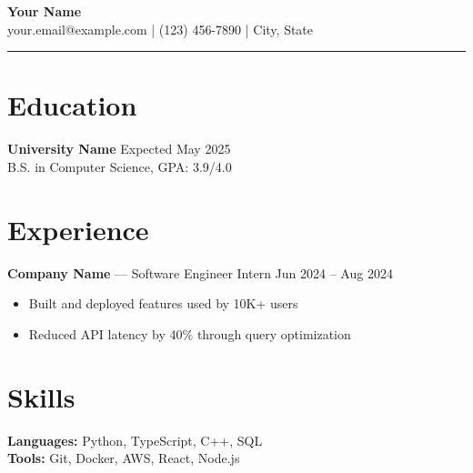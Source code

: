 \documentclass[11pt]{article}
\begin{document}
\begin{center}
{\LARGE \textbf{Your Name}}\\[4pt]
your.email@example.com \quad | \quad (123) 456-7890 \quad | \quad City, State
\end{center}

\vspace{8pt}
\hrule
\vspace{8pt}

\section*{Education}
\textbf{University Name} \hfill Expected May 2025\\
B.S. in Computer Science, GPA: 3.9/4.0

\section*{Experience}
\textbf{Company Name} --- Software Engineer Intern \hfill Jun 2024 -- Aug 2024
\begin{itemize}[nosep, leftmargin=*]
  \item Built and deployed features used by 10K+ users
  \item Reduced API latency by 40\% through query optimization
\end{itemize}

\section*{Skills}
\textbf{Languages:} Python, TypeScript, C++, SQL\\
\textbf{Tools:} Git, Docker, AWS, React, Node.js
\end{document}
